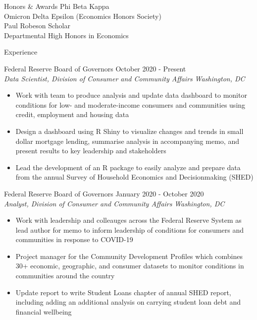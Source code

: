 \documentclass{resume} %
\begin{document}
\begin{rSection}{Honors \& Awards}
{Phi Beta Kappa}\\
{Omicron Delta Epsilon (Economics Honors Society)}\\
{Paul Robeson Scholar}\\
{Departmental High Honors in Economics}

\end{rSection}
\begin{rSection}{Experience}

{Federal Reserve Board of Governors} \hfill {October 2020 - Present}\\
{\em Data Scientist, Division of Consumer and Community Affairs} \hfill {\em Washington, DC}
\begin{itemize}[leftmargin=*,  noitemsep, topsep=0pt]
\item Work with team to produce analysis and update data dashboard to monitor conditions for low- and moderate-income consumers and communities using credit, employment and housing data
\item Design a dashboard using R Shiny to visualize changes and trends in small dollar mortgage lending, summarise analysis in accompanying memo, and present results to key leadership and stakeholders
\item Lead the development of an R package to easily analyze and prepare data from the annual Survey of Household Economics and Decisionmaking (SHED) 
\end{itemize}

{Federal Reserve Board of Governors} \hfill {January 2020 - October 2020}\\
{\em Analyst, Division of Consumer and Community Affairs} \hfill {\em Washington, DC}
\begin{itemize}[leftmargin=*,  noitemsep, topsep=0pt]
\item Work with leadership and colleauges across the Federal Reserve System as lead author for memo to inform leadership of conditions for consumers and communities in response to COVID-19
\item Project manager for the Community Development Profiles which combines 30+ economic, geographic, and consumer datasets to monitor conditions in communities around the country
\item Update report to write Student Loans chapter of annual SHED report, including adding an additional analysis on carrying student loan debt and financial wellbeing


\end{itemize}
\end{rSection}
\end{document}
